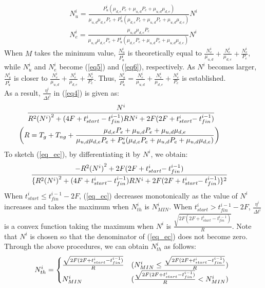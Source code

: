 \documentclass{ieeeaccess}
\begin{document}
%
\begin{align}
N_u^i=\frac{P_u^i(\mu_{d,e}P_e+\mu_{u,d}P_e+\mu_{u,d}\mu_{d,e})}{\mu_{u,d}\mu_{d,e}P_e+P_u^i(\mu_{d,e}P_e+\mu_{u,d}P_e+\mu_{u,d}\mu_{d,e})}N^i\label{eq5}\\
N_e^i=\frac{\mu_{u,d}\mu_{d,e}P_e}{\mu_{u,d}\mu_{d,e}P_e+P_u^i(\mu_{d,e}P_e+\mu_{u,d}P_e+\mu_{u,d}\mu_{d,e})}N^i\label{eq6}
\end{align}
%
When $M$ takes the minimum value, $\frac{N_u^i}{P_u^i}$ is theoretically equal to $\frac{N_e^i}{\mu_{u,d}}+\frac{N_e^i}{\mu_{d,e}}+\frac{N_e^i}{P_e}$, while $N_u^i$ and $N_e^i$ become (\ref{eq5}) and (\ref{eq6}), respectively.
%
As $N^i$ becomes larger, $\frac{N_u^i}{P_u^i}$ is closer to $\frac{N_e^i}{\mu_{u,d}}+\frac{N_e^i}{\mu_{d,e}}+\frac{N_e^i}{P_e}$.
%
Thus, $\frac{N_u^i}{P_u^i}=\frac{N_e^i}{\mu_{u,d}}+\frac{N_e^i}{\mu_{d,e}}+\frac{N_e^i}{P_e}$ is established.\\
%
As a result, $\frac{\eta^{i}}{{\Delta{t}}^i}$ in (\ref{eq4}) is given as:
%
\begin{align}
&\hspace{-0.2cm}\frac{N^i}{R^2{(N^i)}^2+(4F+t_{start}^i-t_{fin}^{i-1})R{N^i}+2F(2F+t_{start}^i\hspace{-1mm}-t_{fin}^{i-1})}\hspace{1cm}\label{eq_ec}\\
&\hspace{-0.6cm}\biggl(R=T_g+T_{ng}+\frac{\mu_{d,e}P_e+\mu_{u,d}P_e+\mu_{u,d}\mu_{d,e}}{\mu_{u,d}\mu_{d,e}P_e+P_u^i(\mu_{d,e}P_e+\mu_{u,d}P_e+\mu_{u,d}\mu_{d,e})}\biggr)\nonumber
\end{align}
%
To sketch (\ref{eq_ec}), by differentiating it by $N^i$, we obtain:
%
\begin{align}
\hspace{-4mm} \frac{-{R^2{(N^i)}^2}+2F(2F+t_{start}^i\hspace{-1mm}-t_{fin}^{i-1})}{\{R^2{(N^i)}^2+(4F+t_{start}^i\hspace{-1mm}-t_{fin}^{i-1})R{N^i}+2F(2F+t_{start}^i\hspace{-1mm}-t_{fin}^{i-1})\}^2}
\end{align}
%
When $t_{start}^i \leq{t_{fin}^{i-1}-2F}$, (\ref{eq_ec}) decreases monotonically as the value of $N^i$ increases and takes the maximum when $N_{th}^i$ is $N_{MIN}^i$.
%
When $t_{start}^i >{t_{fin}^{i-1}-2F}$, $\frac{\eta^{i}}{{\Delta{t}}^i}$ is a convex function taking the maximum when $N^i$ is $\frac{\sqrt{2F(2F+t_{start}^i-t_{fin}^{i-1})}}{R}$.
%
Note that $N^i$ is chosen so that the denominator of (\ref{eq_ec}) does not become zero.
%
Through the above procedures, we can obtain $N_{th}^i$ as follows:
%
\begin{align}
 \hspace{-1.5mm} N_{th}^i= \begin{cases}
    \frac{\sqrt{2F(2F+t_{start}^i-t_{fin}^{i-1})}}{R} & ({N_{MIN}^i}\leq{\frac{\sqrt{2F(2F+t_{start}^i-t_{fin}^{i-1})}}{R}}) \\
    N_{MIN}^i& (\frac{\sqrt{2F(2F+t_{start}^i-t_{fin}^{i-1})}}{R}<{N_{MIN}^i})
  \end{cases}
\end{align}
\end{document}
